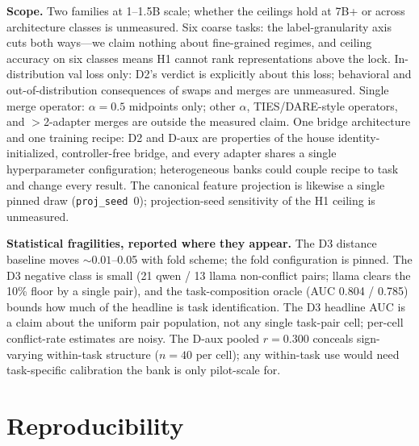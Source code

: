 \documentclass{article}
\begin{document}
\textbf{Scope.} Two families at 1--1.5B scale; whether the ceilings hold
at 7B+ or across architecture classes is unmeasured. Six coarse tasks: the
label-granularity axis cuts both ways---we claim nothing about fine-grained
regimes, and ceiling accuracy on six classes means H1 cannot rank
representations above the lock. In-distribution val loss only: D2's verdict
is explicitly about this loss; behavioral and out-of-distribution
consequences of swaps and merges are unmeasured. Single merge operator:
$\alpha = 0.5$ midpoints only; other $\alpha$, TIES/DARE-style operators,
and $>$2-adapter merges are outside the measured claim. One bridge
architecture and one training recipe: D2 and D-aux are properties of the
house identity-initialized, controller-free bridge, and every adapter
shares a single hyperparameter configuration; heterogeneous banks could
couple recipe to task and change every result. The canonical feature
projection is likewise a single pinned draw (\texttt{proj\_seed}~0);
projection-seed sensitivity of the H1 ceiling is unmeasured.

\textbf{Statistical fragilities, reported where they appear.} The D3
distance baseline moves ${\sim}0.01$--0.05 with fold scheme; the fold
configuration is pinned. The D3 negative class is small (21 qwen / 13
llama non-conflict pairs; llama clears the 10\% floor by a single pair),
and the task-composition oracle (AUC 0.804 / 0.785) bounds how much of the
headline is task identification. The D3 headline AUC is a claim about the
uniform pair population, not any single task-pair cell; per-cell
conflict-rate estimates are noisy. The D-aux pooled $r = 0.300$ conceals
sign-varying within-task structure ($n = 40$ per cell); any within-task use
would need task-specific calibration the bank is only pilot-scale for.

\section{Reproducibility}
\label{sec:repro}
\end{document}
